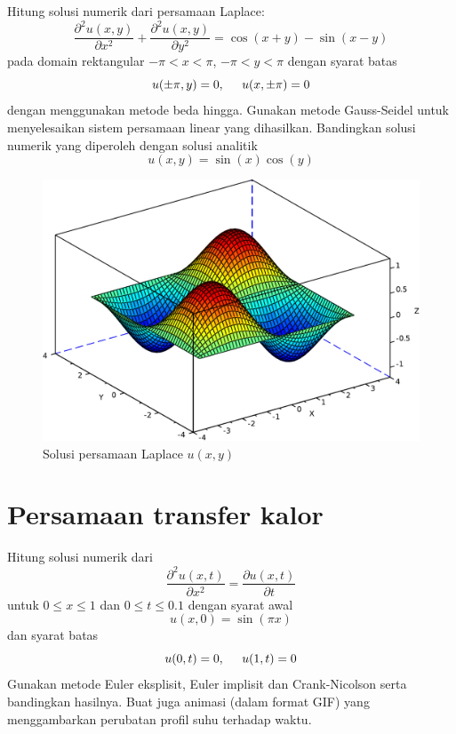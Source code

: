 \documentclass[12pt,bahasa]{article}
\begin{document}
Hitung solusi numerik dari persamaan Laplace:
\begin{equation}
\frac{\partial^2 u(x,y)}{\partial x^2} +
\frac{\partial^2 u(x,y)}{\partial y^2} = \cos(x + y) - \sin(x - y)
\end{equation}
pada domain rektangular $-\pi < x < \pi$, $-\pi < y < \pi$ dengan syarat batas
\begin{equation}
u(\pm\pi,y) = 0, \hspace{0.5cm} u(x,\pm\pi) = 0
\end{equation}
dengan menggunakan metode beda hingga. Gunakan metode Gauss-Seidel untuk
menyelesaikan sistem persamaan linear yang dihasilkan.
Bandingkan solusi numerik yang diperoleh dengan
solusi analitik
\begin{equation}
u(x,y) = \sin(x)\cos(y)
\end{equation}

\begin{figure}[H]
\centering
\includegraphics[scale=0.5]{poisson2d.pdf}
\par
\caption{Solusi persamaan Laplace $u(x,y)$}
\end{figure}


\section{Persamaan transfer kalor}

Hitung solusi numerik dari
\begin{equation}
\frac{\partial^2 u(x,t)}{\partial x^2} = \frac{\partial u(x,t)}{\partial t}
\end{equation}
untuk $0 \leq x \leq 1$ dan $0 \leq t \leq 0.1$ dengan syarat awal
\begin{equation}
u(x,0) = \sin(\pi x)
\end{equation}
dan syarat batas
\begin{equation}
u(0,t) = 0,\hspace{0.5cm} u(1,t) = 0
\end{equation}
Gunakan metode Euler eksplisit, Euler implisit dan Crank-Nicolson serta
bandingkan hasilnya.
Buat juga animasi (dalam format GIF) yang menggambarkan perubatan profil
suhu terhadap waktu.
\end{document}
